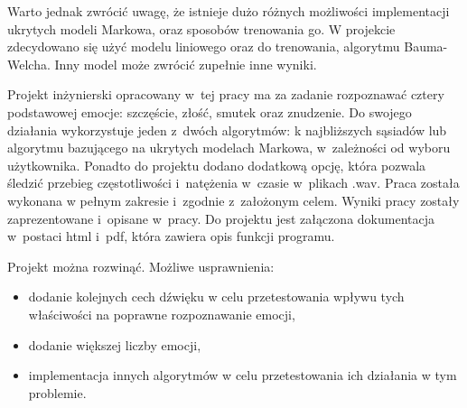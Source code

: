 \documentclass[declaration,shortabstract]{iithesis}
\begin{document}
Warto jednak zwrócić uwagę, że istnieje dużo różnych możliwości implementacji ukrytych modeli Markowa, oraz sposobów trenowania go. W projekcie zdecydowano się użyć modelu liniowego oraz do trenowania, algorytmu Bauma-Welcha. Inny model może zwrócić zupełnie inne wyniki.

Projekt inżynierski opracowany w~tej pracy ma za zadanie rozpoznawać cztery podstawowej emocje: szczęście, złość, smutek oraz znudzenie. Do swojego działania wykorzystuje jeden z~dwóch algorytmów: k najbliższych sąsiadów lub algorytmu bazującego na ukrytych modelach Markowa, w~zależności od wyboru użytkownika. Ponadto do projektu dodano dodatkową opcję, która pozwala śledzić przebieg częstotliwości i~natężenia w~czasie w~plikach .wav. Praca została wykonana w pełnym zakresie i~zgodnie z~założonym celem. Wyniki pracy zostały zaprezentowane i~opisane w~pracy. Do projektu jest załączona dokumentacja w~postaci html i~pdf, która zawiera opis funkcji programu.

Projekt można rozwinąć. Możliwe usprawnienia:
\begin{itemize}
\item dodanie kolejnych cech dźwięku w celu przetestowania wpływu tych właściwości na poprawne rozpoznawanie emocji,
\item dodanie większej liczby emocji,
\item implementacja innych algorytmów w celu przetestowania ich działania w tym problemie.
\end{itemize}

\listoffigures
\listoftables
\nocite{*}
\printbibliography
\end{document}
